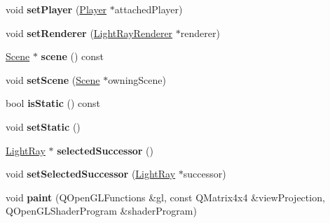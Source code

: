 \begin{DoxyCompactItemize}
\item 
\hypertarget{class_light_ray_a3720775f0e8d6c5a8041fd6a7b371dad}{}void {\bfseries set\+Player} (\hyperlink{class_player}{Player} $\ast$attached\+Player)\label{class_light_ray_a3720775f0e8d6c5a8041fd6a7b371dad}

\item 
\hypertarget{class_light_ray_ad507b2707408f92aac2962134ed72fb8}{}void {\bfseries set\+Renderer} (\hyperlink{class_light_ray_renderer}{Light\+Ray\+Renderer} $\ast$renderer)\label{class_light_ray_ad507b2707408f92aac2962134ed72fb8}

\item 
\hypertarget{class_light_ray_a7ad5ff6f8863759c2183c95ba8914dfc}{}\hyperlink{class_scene}{Scene} $\ast$ {\bfseries scene} () const \label{class_light_ray_a7ad5ff6f8863759c2183c95ba8914dfc}

\item 
\hypertarget{class_light_ray_a82577f82a77e84b81bd1b722a00bde54}{}void {\bfseries set\+Scene} (\hyperlink{class_scene}{Scene} $\ast$owning\+Scene)\label{class_light_ray_a82577f82a77e84b81bd1b722a00bde54}

\item 
\hypertarget{class_light_ray_a86e10593e7c2e3a4bbbbf817dd774c27}{}bool {\bfseries is\+Static} () const \label{class_light_ray_a86e10593e7c2e3a4bbbbf817dd774c27}

\item 
\hypertarget{class_light_ray_a6694333616a4d172f1c1bcb4ccbe1587}{}void {\bfseries set\+Static} ()\label{class_light_ray_a6694333616a4d172f1c1bcb4ccbe1587}

\item 
\hypertarget{class_light_ray_ad7a12f31f9f84adc155211009a677d77}{}\hyperlink{class_light_ray}{Light\+Ray} $\ast$ {\bfseries selected\+Successor} ()\label{class_light_ray_ad7a12f31f9f84adc155211009a677d77}

\item 
\hypertarget{class_light_ray_a2644a596af5de9b41f770131b5c2b0eb}{}void {\bfseries set\+Selected\+Successor} (\hyperlink{class_light_ray}{Light\+Ray} $\ast$successor)\label{class_light_ray_a2644a596af5de9b41f770131b5c2b0eb}

\item 
\hypertarget{class_light_ray_acd346957efa39055b61eb9b2be660011}{}void {\bfseries paint} (Q\+Open\+G\+L\+Functions \&gl, const Q\+Matrix4x4 \&view\+Projection, Q\+Open\+G\+L\+Shader\+Program \&shader\+Program)\label{class_light_ray_acd346957efa39055b61eb9b2be660011}

\end{DoxyCompactItemize}
